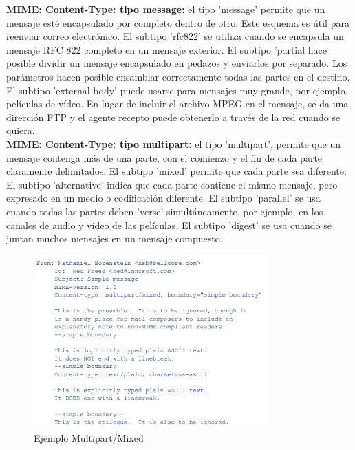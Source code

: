 \documentclass[a4paper,11pt]{article}
\begin{document}
\textbf{MIME: Content-Type: tipo message:} el tipo 'message' permite que un mensaje esté encapsulado por completo dentro de otro. Este esquema es útil para reenviar correo electrónico. El subtipo 'rfc822' se utiliza cuando se encapsula un mensaje RFC 822 completo en un mensaje exterior. El subtipo 'partial hace posible dividir un mensaje encapsulado en pedazos y enviarlos por separado. Los parámetros hacen posible ensamblar correctamente todas las partes en el destino. El subtipo 'external-body' puede usarse para mensajes muy grande, por ejemplo, películas de vídeo. En lugar de incluir el archivo MPEG en el mensaje, se da una dirección FTP y el agente recepto puede obtenerlo a través de la red cuando se quiera. \\

\textbf{MIME: Content-Type: tipo multipart:} el tipo 'multipart', permite que un mensaje contenga más de una parte, con el comienzo y el fin de cada parte claramente delimitados. El subtipo 'mixed' permite que cada parte sea diferente. El subtipo 'alternative' indica que cada parte contiene el mismo mensaje, pero expresado en un medio o codificación diferente. El subtipo 'parallel' se usa cuando todas las partes deben 'verse' simultáneamente, por ejemplo, en los canales de audio y vídeo de las películas. El subtipo 'digest' se usa cuando se juntan muchos mensajes en un mensaje compuesto. \\

\begin{figure}[h]
\centering
\caption{Ejemplo Multipart/Mixed}
\includegraphics[scale=1,width=0.8\textwidth]{ejemplo_multipart_fixed.png}
\end{figure}
\end{document}
